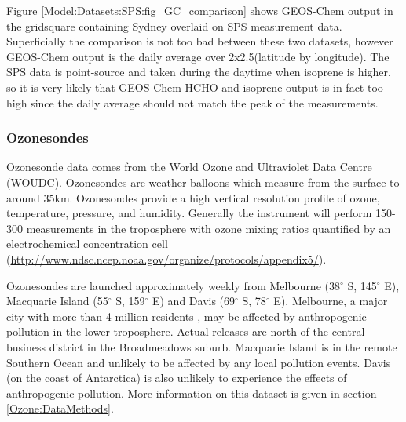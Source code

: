       {\label{Model:Datasets:SPS:fig_series}}
      
      Figure \ref{Model:Datasets:SPS:fig_GC_comparison} shows GEOS-Chem output in the gridsquare containing Sydney overlaid on SPS measurement data.
      Superficially the comparison is not too bad between these two datasets, however GEOS-Chem output is the daily average over 2x2.5\degr (latitude by longitude).
      The SPS data is point-source and taken during the daytime when isoprene is higher, so it is very likely that GEOS-Chem HCHO and isoprene output is in fact too high since the daily average should not match the peak of the measurements.
      
      

    \subsubsection{Ozonesondes}
      \label{Model:Datasets:ozonesondes}
      
      Ozonesonde data comes from the World Ozone and Ultraviolet Data Centre (WOUDC).
      Ozonesondes are weather balloons which measure from the surface to around 35km.
      Ozonesondes provide a high vertical resolution profile of ozone, temperature, pressure, and humidity.
      Generally the instrument will perform 150-300 measurements in the troposphere with ozone mixing ratios quantified by an electrochemical concentration cell (\url{http://www.ndsc.ncep.noaa.gov/organize/protocols/appendix5/}).
      
      Ozonesondes are launched approximately weekly from Melbourne (38$^{\circ}$ S, 145$^{\circ}$ E), Macquarie Island (55$^{\circ}$ S, 159$^{\circ}$ E) and Davis (69$^{\circ}$ S, 78$^{\circ}$ E). 
      Melbourne, a major city with more than 4 million residents \parencite{ABS2016}, may be affected by anthropogenic pollution in the lower troposphere.
      Actual releases are north of the central business district in the Broadmeadows suburb.
      Macquarie Island is in the remote Southern Ocean and unlikely to be affected by any local pollution events.
      Davis (on the coast of Antarctica) is also unlikely to experience the effects of anthropogenic pollution.
      More information on this dataset is given in section \ref{Ozone:DataMethods}.
      

